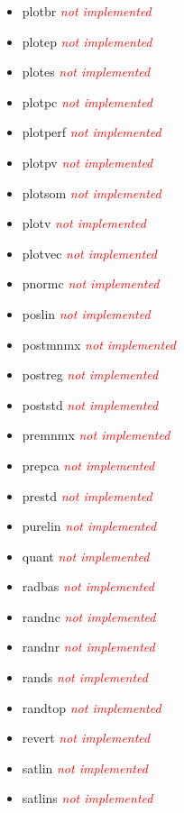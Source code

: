 \begin{itemize}
	\item plotbr \textcolor{red}{\textit{not implemented}}
	\item plotep \textcolor{red}{\textit{not implemented}}
	\item plotes \textcolor{red}{\textit{not implemented}}
	\item plotpc \textcolor{red}{\textit{not implemented}}
	\item plotperf \textcolor{red}{\textit{not implemented}}
	\item plotpv \textcolor{red}{\textit{not implemented}}
	\item plotsom \textcolor{red}{\textit{not implemented}}
	\item plotv \textcolor{red}{\textit{not implemented}}
	\item plotvec \textcolor{red}{\textit{not implemented}}
	\item pnormc \textcolor{red}{\textit{not implemented}}
	\item poslin \textcolor{red}{\textit{not implemented}}
	\item postmnmx \textcolor{red}{\textit{not implemented}}
	\item postreg \textcolor{red}{\textit{not implemented}}
	\item poststd \textcolor{red}{\textit{not implemented}}
	\item premnmx \textcolor{red}{\textit{not implemented}}
	\item prepca \textcolor{red}{\textit{not implemented}}
	\item prestd \textcolor{red}{\textit{not implemented}}
	\item purelin \textcolor{red}{\textit{not implemented}}
	\item quant \textcolor{red}{\textit{not implemented}}
	\item radbas \textcolor{red}{\textit{not implemented}}
	\item randnc \textcolor{red}{\textit{not implemented}}
	\item randnr \textcolor{red}{\textit{not implemented}}
	\item rands \textcolor{red}{\textit{not implemented}}
	\item randtop \textcolor{red}{\textit{not implemented}}
	\item revert \textcolor{red}{\textit{not implemented}}
	\item satlin \textcolor{red}{\textit{not implemented}}
	\item satlins \textcolor{red}{\textit{not implemented}}

\end{itemize}
